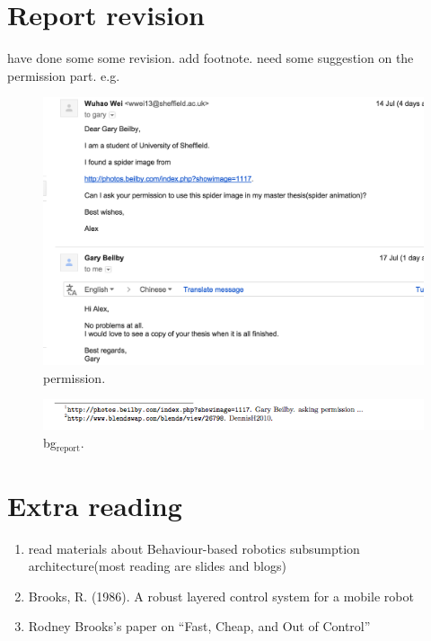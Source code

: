 \documentclass[11pt]{article}
\begin{document}
\section{Report revision}
\label{sec-2}
have done some some revision. 
add footnote. need some suggestion on the permission part.
e.g. 
\begin{figure}[htb]
\centering
\includegraphics[width=.9\linewidth]{./img/permission_sample.png}
\caption{\label{mylabel}permission.}
\end{figure}

\begin{figure}[htb]
\centering
\includegraphics[width=.9\linewidth]{./img/how_to_add.png}
\caption{\label{mylabel}bg$_{\text{report}}$.}
\end{figure}




\section{Extra reading}
\label{sec-3}
\begin{enumerate}
\item read materials about Behaviour-based robotics
subsumption architecture(most reading are slides and blogs)
\item Brooks, R. (1986). A robust layered control system for a mobile robot
\item Rodney Brooks’s paper on “Fast, Cheap, and Out of Control”
\end{enumerate}
\end{document}
